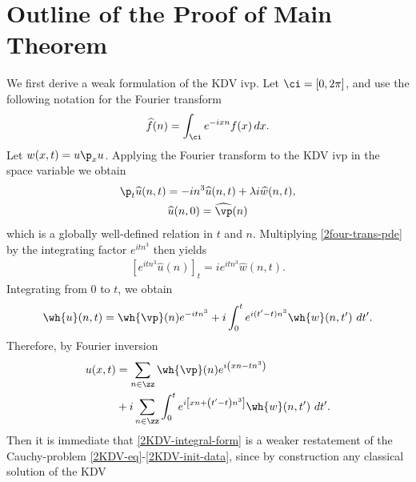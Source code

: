 \section{Outline of the Proof of Main Theorem}
%
%
%
%
%
We first derive a weak formulation of the KDV ivp. 
Let $\ci = [0, 2 \pi]$, and use
the following notation for the Fourier transform
%
%
%
%
\begin{equation*}
	\begin{split}
		\widehat{f}(n) = \int_{\ci} e^{-ix n} f(x) \, dx.
	\end{split}
\end{equation*}
Let $w(x,t) = u \p_x u$. Applying 
the Fourier transform to the KDV ivp in the space variable we obtain 
%
%
\begin{gather}
	\label{2four-trans-pde}
	\p_t \widehat{u}(n, t) = -i n^3 \widehat{u}(n, t) + \lambda i  
	\widehat{w} (n, t),
	\\
	\notag
	\widehat{u} (n,0) = \widehat{\vp}(n)
\end{gather}
%
%
which is a globally well-defined relation in $t$ 
and $n$. Multiplying \eqref{2four-trans-pde} by the integrating factor $e^{itn^3}$ then yields
\begin{equation*}
	\begin{split}
		\left[e^{it n^3} \widehat{u}(n) \right]_t = i
		 e^{it n^3} \widehat{w} (n, t).	
	\end{split}
\end{equation*}
%
%
Integrating from $0$ to $t$, we obtain
%
%
\begin{equation*}
	\begin{split}
		\wh{u}(n, t) = \wh{\vp}(n) e^{- it n^3} + i  
		\int_0^t e^{i(t' - t) n^3} \wh{w}(n, t') \ 
		dt'.
	\end{split}
\end{equation*}
%
%
Therefore, by Fourier inversion 
%
%
\begin{equation}
	\label{2KDV-integral-form}
	\begin{split}
		u(x,t) & = \sum_{n \in \zz} \wh{\vp}(n) e^{i\left( xn - t n^3 
		\right)} 
		\\
		& + i \sum_{n \in \zz} \int_0^t e^{i\left[ xn + \left( t' - t 
		\right) n^3 \right]} \wh{w}(n, t') \ dt'.
	\end{split}
\end{equation}
%
%
Then it is immediate that \eqref{2KDV-integral-form} is a weaker 
restatement of the Cauchy-problem \eqref{2KDV-eq}-\eqref{2KDV-init-data}, 
since by construction any classical solution of the KDV 
